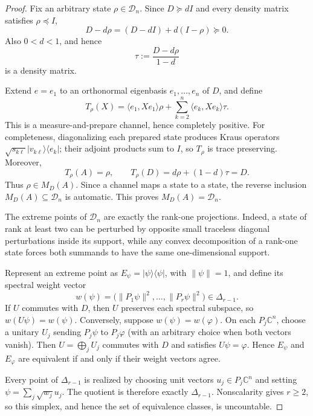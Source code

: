 \documentclass[11pt]{article}
\newcommand{\C}{\mathbb C}
\newcommand{\Dens}{\mathcal D}
\begin{document}
\begin{proof}
Fix an arbitrary state \(\rho\in\Dens_n\).  Since \(D\succeq dI\) and
every density matrix satisfies \(\rho\preceq I\),
\begin{equation}\label{eq:positive}
 D-d\rho=(D-dI)+d(I-\rho)\succeq0.
\end{equation}
Also \(0<d<1\), and hence
\[
 \tau:=\frac{D-d\rho}{1-d}
\]
is a density matrix.

Extend \(e=e_1\) to an orthonormal eigenbasis
\(e_1,\ldots,e_n\) of \(D\), and define
\begin{equation}\label{eq:channel}
 T_\rho(X)=\langle e_1,Xe_1\rangle\rho
 +\sum_{k=2}^n\langle e_k,Xe_k\rangle\tau.
\end{equation}
This is a measure-and-prepare channel, hence completely positive.  For
completeness, diagonalizing each prepared state produces Kraus operators
\(\sqrt{s_{k\ell}}|v_{k\ell}\rangle\langle e_k|\); their adjoint products
sum to \(I\), so \(T_\rho\) is trace preserving.  Moreover,
\[
 T_\rho(A)=\rho,
 \qquad
 T_\rho(D)=d\rho+(1-d)\tau=D.
\]
Thus \(\rho\in M_D(A)\).  Since a channel maps a state to a state, the
reverse inclusion \(M_D(A)\subseteq\Dens_n\) is automatic.  This proves
\(M_D(A)=\Dens_n\).

The extreme points of \(\Dens_n\) are exactly the rank-one projections.
Indeed, a state of rank at least two can be perturbed by opposite small
traceless diagonal perturbations inside its support, while any convex
decomposition of a rank-one state forces both summands to have the same
one-dimensional support.

Represent an extreme point as \(E_\psi=|\psi\rangle\langle\psi|\), with
\(\|\psi\|=1\), and define its spectral weight vector
\[
 w(\psi)=\bigl(\|P_1\psi\|^2,\ldots,\|P_r\psi\|^2\bigr)\in\Delta_{r-1}.
\]
If \(U\) commutes with \(D\), then \(U\) preserves each spectral subspace,
so \(w(U\psi)=w(\psi)\).  Conversely, suppose
\(w(\psi)=w(\varphi)\).  On each \(P_j\C^n\), choose a unitary \(U_j\)
sending \(P_j\psi\) to \(P_j\varphi\) (with an arbitrary choice when both
vectors vanish).  Then \(U=\bigoplus_jU_j\) commutes with \(D\) and satisfies
\(U\psi=\varphi\).  Hence \(E_\psi\) and \(E_\varphi\) are equivalent if
and only if their weight vectors agree.

Every point of \(\Delta_{r-1}\) is realized by choosing unit vectors
\(u_j\in P_j\C^n\) and setting \(\psi=\sum_j\sqrt{w_j}u_j\).  The quotient
is therefore exactly \(\Delta_{r-1}\).  Nonscalarity gives \(r\ge2\), so
this simplex, and hence the set of equivalence classes, is uncountable.
\end{proof}
\end{document}
